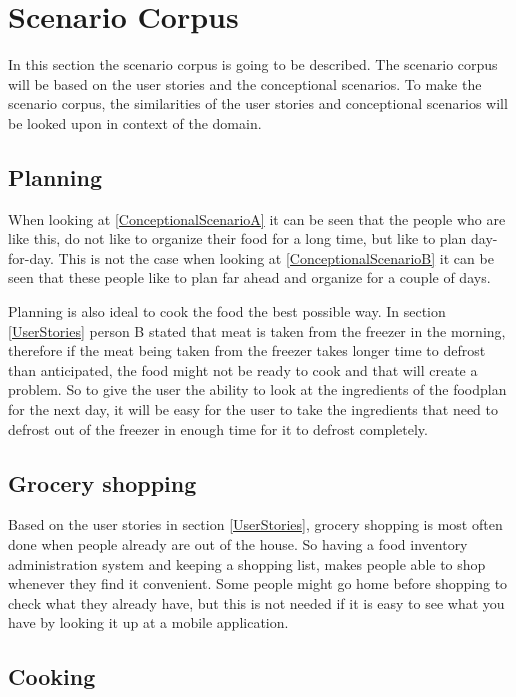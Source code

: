 \section{Scenario Corpus}

In this section the scenario corpus is going to be described. The scenario corpus will be based on the user stories and the conceptional scenarios. To make the scenario corpus, the similarities of the user stories and conceptional scenarios will be looked upon in context of the domain.

\subsection{Planning}

When looking at \ref{ConceptionalScenarioA} it can be seen that the people who are like this, do not like to organize their food for a long time, but like to plan day-for-day. This is not the case when looking at \ref{ConceptionalScenarioB} it can be seen that these people like to plan far ahead and organize for a couple of days.

Planning is also ideal to cook the food the best possible way. In section \ref{UserStories} person B stated that meat is taken from the freezer in the morning, therefore if the meat being taken from the freezer takes longer time to defrost than anticipated, the food might not be ready to cook and that will create a problem. So to give the user the ability to look at the ingredients of the foodplan for the next day, it will be easy for the user to take the ingredients that need to defrost out of the freezer in enough time for it to defrost completely. 

\subsection{Grocery shopping}

Based on the user stories in section \ref{UserStories}, grocery shopping is most often done when people already are out of the house. So having a food inventory administration system and keeping a shopping list, makes people able to shop whenever they find it convenient. Some people might go home before shopping to check what they already have, but this is not needed if it is easy to see what you have by looking it up at a mobile application.

\subsection{Cooking}

